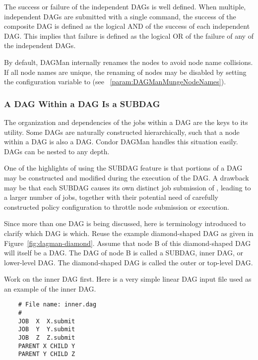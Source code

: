 The success or failure of the independent DAGs is well defined.
When multiple, independent DAGs are submitted with a single
command, the
success of the composite DAG is defined as the logical AND
of the success of each independent DAG.
This implies that failure is defined as the logical OR
of the failure of any of the independent DAGs.

By default, DAGMan internally renames the nodes to avoid node name collisions.  
If all node names are unique, 
the renaming of nodes may be disabled by
setting the configuration variable 
to  (see ~\ref{param:DAGManMungeNodeNames}).


\subsubsection{\label{sec:DAGsinDAGs}A DAG Within a DAG Is a SUBDAG}

The organization and dependencies of the jobs within a DAG
are the keys to its utility.
Some DAGs are naturally constructed hierarchically,
such that a node within a DAG is also a DAG.
Condor DAGMan handles this situation easily.
DAGs can be nested to any depth.

One of the highlights of using the SUBDAG feature is that portions of a DAG
may be constructed and modified during the execution of the DAG.
A drawback may be that each SUBDAG causes its own distinct job submission
of , leading to a larger number of jobs,
together with their potential need of carefully constructed policy configuration
to throttle node submission or execution.

Since more than one DAG is being discussed, 
here is terminology introduced to clarify which DAG is which. 
Reuse the example diamond-shaped DAG as given in 
Figure~\ref{fig:dagman-diamond}.
Assume that node B of this diamond-shaped DAG
will itself be a DAG.
The DAG of node B is called a SUBDAG, inner DAG, or lower-level DAG.
The diamond-shaped DAG is called the outer or top-level DAG.

Work on the inner DAG first.
Here is a very simple linear DAG input file used as
an example of the inner DAG.
\begin{verbatim}
    # File name: inner.dag
    #
    JOB  X  X.submit
    JOB  Y  Y.submit
    JOB  Z  Z.submit
    PARENT X CHILD Y
    PARENT Y CHILD Z
\end{verbatim}

